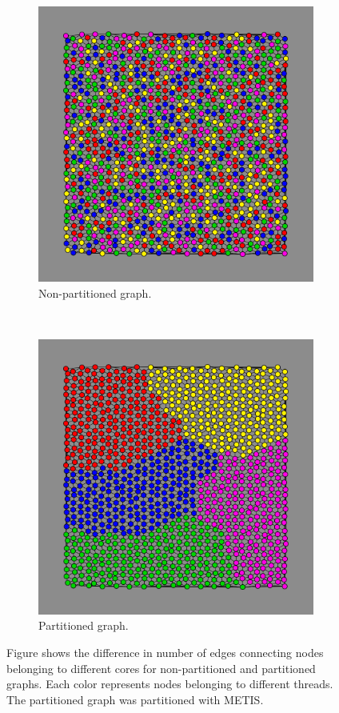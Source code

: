 \begin{figure}[H]
\centering
\begin{subfigure}[b]{0.48\textwidth}
\includegraphics[width=\textwidth]{img/partitioning_false.png}
\caption{Non-partitioned graph.}
\end{subfigure}
~
\begin{subfigure}[b]{0.48\textwidth}
\includegraphics[width=\textwidth]{img/partitioning_true.png}
\caption{Partitioned graph.}
\end{subfigure}
\caption{Figure shows the difference in number of edges connecting nodes belonging to different cores for non-partitioned and partitioned graphs. Each color represents nodes belonging to different threads. The partitioned graph was partitioned with METIS.}
\label{fig:partitioning}
\end{figure}
